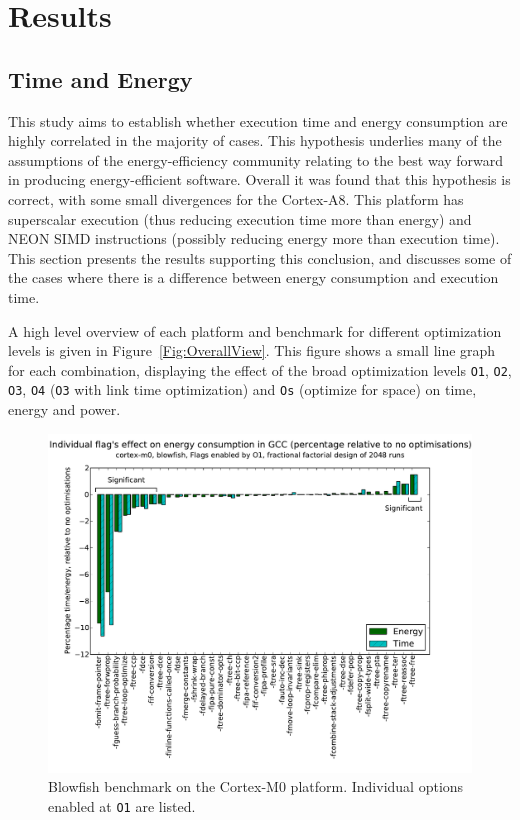 \documentclass[twocolumn]{article}
\let\oldcaption\caption
\renewcommand{\caption}[1]{\oldcaption{\textup{#1}}}
\begin{document}
\section{Results}


\subsection*{Time and Energy}

This study aims to establish whether execution time and energy consumption are highly correlated in the majority of cases. This hypothesis underlies many of the assumptions of the energy-efficiency community relating to the best way forward in producing energy-efficient software. Overall it was found that this hypothesis is correct, with some small divergences for the Cortex-A8. This platform has superscalar execution (thus reducing execution time more than energy) and NEON SIMD instructions (possibly reducing energy more than execution time). This section presents the results supporting this conclusion, and discusses some of the cases where there is a difference between energy consumption and execution time.

A high level overview of each platform and benchmark for different optimization levels is given in Figure~\ref{Fig:OverallView}. This figure shows a small line graph for each combination, displaying the effect of the broad optimization levels \texttt{O1}, \texttt{O2}, \texttt{O3}, \texttt{O4} (\texttt{O3} with link time optimization) and \texttt{Os} (optimize for space) on time, energy and power.

\begin{figure}[t]
	\includegraphics[width=\linewidth,clip,trim=0.5cm 0 2cm 1.8cm]{cortex-m0/O1_main_effects_blowfish.pdf}
	\caption{Blowfish benchmark on the Cortex-M0 platform. Individual options enabled at \texttt{O1} are listed.}
	\label{Fig:BlowfishMainEffects}
\end{figure}
\end{document}
